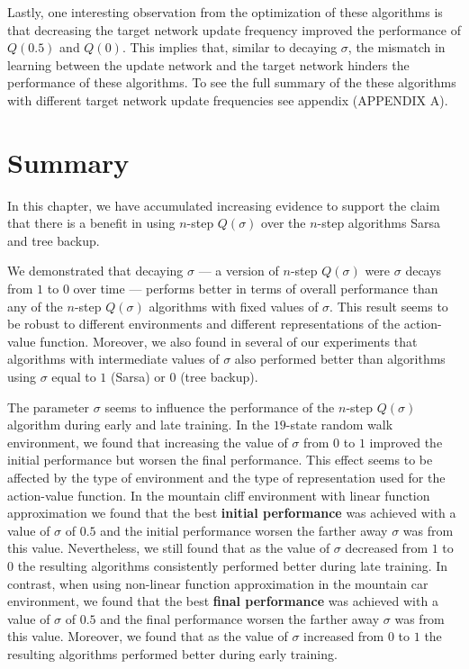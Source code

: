 Lastly, one interesting observation from the optimization of these algorithms is that decreasing the target network update frequency improved the performance of $Q(0.5)$ and $Q(0)$.
This implies that, similar to decaying $\sigma$, the mismatch in learning between the update network and the target network hinders the performance of these algorithms.
To see the full summary of the these algorithms with different target network update frequencies see appendix (APPENDIX A).

\section{Summary}

In this chapter, we have accumulated increasing evidence to support the claim that there is a benefit in using $n$-step $Q(\sigma)$ over the $n$-step algorithms Sarsa and tree backup.

We demonstrated that decaying $\sigma$ --- a version of $n$-step $Q(\sigma)$ were $\sigma$ decays from $1$ to $0$ over time --- performs better in terms of overall performance than any of the $n$-step $Q(\sigma)$ algorithms with fixed values of $\sigma$.
This result seems to be robust to different environments and different representations of the action-value function.
Moreover, we also found in several of our experiments that algorithms with intermediate values of $\sigma$ also performed better than algorithms using $\sigma$ equal to $1$ (Sarsa) or $0$ (tree backup).

The parameter $\sigma$ seems to influence the performance of the $n$-step $Q(\sigma)$ algorithm during early and late training.
In the $19$-state random walk environment, we found that increasing the value of $\sigma$ from $0$ to $1$ improved the initial performance but worsen the final performance.
This effect 
seems to be affected by the type of environment and the type of representation used for the action-value function.
In the mountain cliff environment with linear function approximation we found that the best \textbf{initial performance} was achieved with a value of $\sigma$ of $0.5$ and the initial performance worsen the farther away $\sigma$ was from this value.
Nevertheless, we still found that as the value of $\sigma$ decreased from $1$ to $0$ the resulting algorithms consistently performed better during late training.
In contrast, when using non-linear function approximation in the mountain car environment, we found that the best \textbf{final performance} was achieved with a value of $\sigma$ of $0.5$ and the final performance worsen the farther away $\sigma$ was from this value.
Moreover, we found that as the value of $\sigma$ increased from $0$ to $1$ the resulting algorithms performed better during early training.

